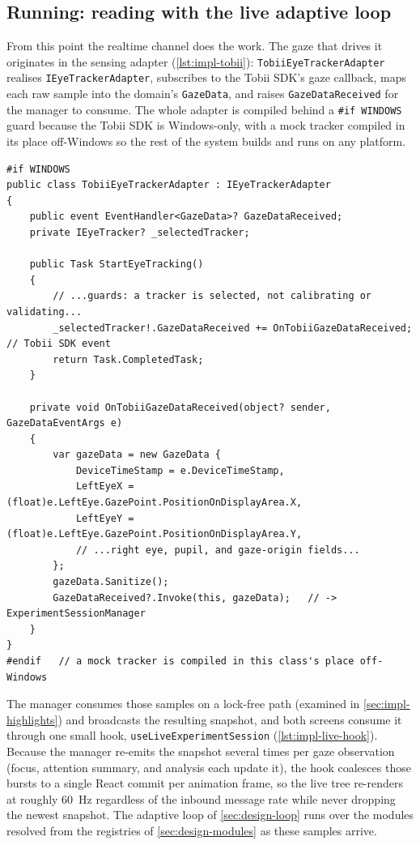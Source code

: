 \subsection*{Running: reading with the live adaptive loop}

From this point the realtime channel does the work.
The gaze that drives it originates in the sensing adapter (\cref{lst:impl-tobii}): \texttt{TobiiEyeTrackerAdapter} realises \texttt{IEyeTrackerAdapter}, subscribes to the Tobii SDK's gaze callback, maps each raw sample into the domain's \texttt{GazeData}, and raises \texttt{GazeDataReceived} for the manager to consume.
The whole adapter is compiled behind a \texttt{\#if WINDOWS} guard because the Tobii SDK is Windows-only, with a mock tracker compiled in its place off-Windows so the rest of the system builds and runs on any platform.

\begin{listing}[htbp]
\begin{verbatim}
#if WINDOWS
public class TobiiEyeTrackerAdapter : IEyeTrackerAdapter
{
    public event EventHandler<GazeData>? GazeDataReceived;
    private IEyeTracker? _selectedTracker;

    public Task StartEyeTracking()
    {
        // ...guards: a tracker is selected, not calibrating or validating...
        _selectedTracker!.GazeDataReceived += OnTobiiGazeDataReceived;   // Tobii SDK event
        return Task.CompletedTask;
    }

    private void OnTobiiGazeDataReceived(object? sender, GazeDataEventArgs e)
    {
        var gazeData = new GazeData {
            DeviceTimeStamp = e.DeviceTimeStamp,
            LeftEyeX = (float)e.LeftEye.GazePoint.PositionOnDisplayArea.X,
            LeftEyeY = (float)e.LeftEye.GazePoint.PositionOnDisplayArea.Y,
            // ...right eye, pupil, and gaze-origin fields...
        };
        gazeData.Sanitize();
        GazeDataReceived?.Invoke(this, gazeData);   // -> ExperimentSessionManager
    }
}
#endif   // a mock tracker is compiled in this class's place off-Windows
\end{verbatim}
\caption{Tobii sensing adapter (abbreviated from \texttt{TobiiEyeTracker\-Adapter.cs}). Realises \texttt{IEyeTrackerAdapter}; the \texttt{\#if WINDOWS} guard keeps the SDK out of non-Windows builds, where a mock fills its place.}
\label{lst:impl-tobii}
\end{listing}

The manager consumes those samples on a lock-free path (examined in \cref{sec:impl-highlights}) and broadcasts the resulting snapshot, and both screens consume it through one small hook, \texttt{useLiveExperimentSession} (\cref{lst:impl-live-hook}).
Because the manager re-emits the snapshot several times per gaze observation (focus, attention summary, and analysis each update it), the hook coalesces those bursts to a single React commit per animation frame, so the live tree re-renders at roughly \SI{60}{\hertz} regardless of the inbound message rate while never dropping the newest snapshot.
The adaptive loop of \cref{sec:design-loop} runs over the modules resolved from the registries of \cref{sec:design-modules} as these samples arrive.

